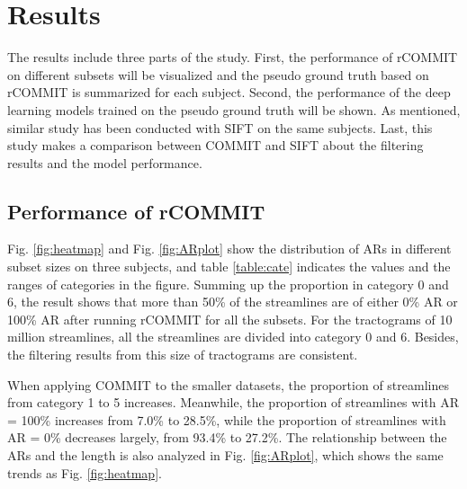 \chapter{Results}

The results include three parts of the study. 
First, the performance of rCOMMIT on different subsets will be visualized and the pseudo ground truth based on 
rCOMMIT is summarized for each subject.
Second, the performance of the deep learning models trained on the pseudo ground truth will be shown. 
As mentioned, similar study has been conducted with SIFT \cite{smithSIFTSphericaldeconvolutionInformed2013} on the same subjects.
Last, this study makes a comparison between COMMIT and SIFT about the filtering results and the model performance. 

\section{Performance of rCOMMIT}

Fig. \ref{fig:heatmap} and Fig. \ref{fig:ARplot} show the distribution of ARs in different subset sizes on three subjects, 
and table \ref{table:cate} indicates the values and the ranges of categories in the figure. 
Summing up the proportion in category 0 and 6, the result shows that more than 50\% of the streamlines
are of either 0\% AR or 100\% AR after running rCOMMIT for all the subsets. For the tractograms of 10 million streamlines, all the streamlines
are divided into category 0 and 6. 
Besides, the filtering results from this size of tractograms are consistent.

When applying COMMIT to the smaller datasets, the proportion of streamlines from 
category 1 to 5 increases. Meanwhile, the proportion of streamlines with AR = 100\% increases from 7.0\% to 28.5\%,
while the proportion of streamlines with AR = 0\% decreases largely, from 93.4\% to 27.2\%.
The relationship between the ARs and the length is also analyzed in Fig. \ref{fig:ARplot}, which shows the same trends as Fig. \ref{fig:heatmap}.



